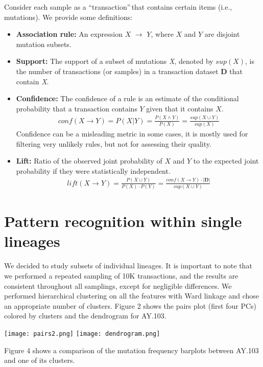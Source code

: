 \documentclass[a0,landscape]{a0poster}
\begin{document}
\begin{multicols}{4}
		Consider each sample as a \textquotedblleft transaction\textquotedblright$\,$that contains certain items (i.e., mutations). We provide some definitions:
		\begin{itemize}
			\item \textbf{Association rule:} An expression $X$ $\rightarrow$ $Y$, where $X$ and $Y$ are disjoint mutation subsets\cite{arules}. 
			\item \textbf{Support:} The support of a subset of mutations \textit{X}, denoted by $sup(X)$, is the number of transactions (or samples) in a transaction dataset \textbf{D} that contain \textit{X}. 
			\item \textbf{Confidence:} The confidence of a rule is an estimate of the conditional probability that a transaction contains $Y$ given that it contains $X$.
			\begin{align*}
				conf(X \rightarrow Y) = P(X|Y) = \frac{P(X \land Y)}{P(X)} = \frac{sup(X \cup Y)}{sup(X)}
			\end{align*}
			Confidence can be a misleading metric in some cases, it is mostly used for filtering very unlikely rules, but not for assessing their quality.
			\item \textbf{Lift:} Ratio of the observed joint probability of $X$ and $Y$ to the expected joint probability if they were statistically independent.	
			\begin{align*}
				lift(X \rightarrow Y) = \frac{P(X\cup Y)}{P(X)\cdot P(Y)} = \frac{conf(X\rightarrow Y)\cdot |\mathbf{D}|}{sup(X\cup Y)}
			\end{align*}
		\end{itemize}
		
		\section*{Pattern recognition within single lineages}
		We decided to study subsets of individual lineages. It is important to note that we performed a repeated sampling of 10K transactions, and the results are consistent throughout all samplings, except for negligible differences. We performed hierarchical clustering on all the features with Ward linkage and chose an appropriate number of clusters. Figure 2 shows the pairs plot (first four PCs) colored by clusters and the dendrogram for AY.103. 
		\begin{center}\vspace{1cm}
			\texttt{[image: pairs2.png]}
			\texttt{[image: dendrogram.png]}
		\end{center}\vspace{1cm}
		Figure 4 shows a comparison of the mutation frequency barplots between AY.103 and one of its clusters. 


\end{multicols}
\end{document}
